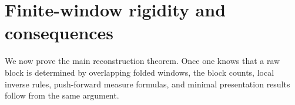 \section{Finite-window rigidity and consequences}

We now prove the main reconstruction theorem.  Once one knows that a raw block
is determined by overlapping folded windows, the block counts, local inverse
rules, push-forward measure formulas, and minimal presentation results follow
from the same argument.




